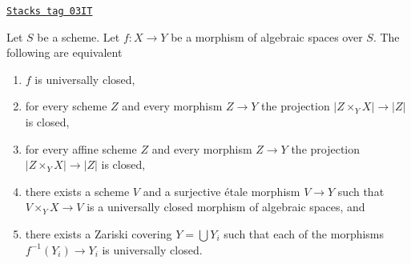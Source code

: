 \begin{lemma}
\label{spaces-morphisms-lemma-universally-closed-local}
\href{https://stacks.math.columbia.edu/tag/03IT}{\texttt{Stacks tag 03IT}}

Let $S$ be a scheme. Let $f : X \to Y$ be a morphism of algebraic spaces
over $S$. The following are equivalent
\begin{enumerate}
\item $f$ is universally closed,
\item for every scheme $Z$ and every morphism $Z \to Y$
the projection $|Z \times_Y X| \to |Z|$ is closed,
\item for every affine scheme $Z$ and every morphism $Z \to Y$
the projection $|Z \times_Y X| \to |Z|$ is closed,
\item there exists a scheme $V$ and a surjective \'etale morphism
$V \to Y$ such that $V \times_Y X \to V$ is a universally closed morphism
of algebraic spaces, and
\item there exists a Zariski covering $Y = \bigcup Y_i$ such that
each of the morphisms $f^{-1}(Y_i) \to Y_i$ is universally closed.
\end{enumerate}
\end{lemma}

